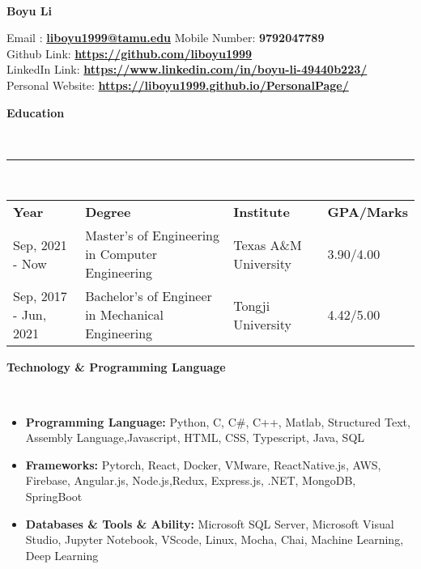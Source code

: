 \documentclass[a4paper,10pt]{article}
\newcommand{\lsep}{-0.5cm}
\newcommand{\resheading}[1]{{\small \colorbox{mygrey}{\begin{minipage}{0.975\textwidth}{\textbf{#1 \vphantom{p\^{E}}}}\end{minipage}}}}
\begin{document}
\hspace{0.5cm}\\[-0.2cm]
\begin{center}
\textbf{Boyu Li}   
\end{center}
\hspace{0.2in}Email : \textbf{\url{liboyu1999@tamu.edu}} \hfill Mobile Number: \textbf{9792047789}  \\
\indent Github Link: \textbf{\url{https://github.com/liboyu1999}}\\
\indent LinkedIn Link: \textbf{\url{https://www.linkedin.com/in/boyu-li-49440b223/}}\\
\indent Personal Website: \textbf{\url{https://liboyu1999.github.io/PersonalPage/}}
 
\resheading{\textbf{Education} }\\[\lsep]

\indent \rule{6.8in}{0.4pt}\\
\indent \begin{tabular}{ l @{\hskip 0.1in} l @{\hskip 0.1in} l @{\hskip 0.1in} l @{\hskip 0.1in} }
\noindent \textbf{Year} & \textbf{Degree} & \textbf{Institute} & \textbf{GPA/Marks}\\
Sep, 2021 - Now & Master's of Engineering in Computer Engineering & Texas A\&M University & 3.90/4.00\\
Sep, 2017 - Jun, 2021 & Bachelor's of Engineer in Mechanical Engineering & Tongji University & 4.42/5.00 \\
 
\end{tabular}

\resheading{\textbf{Technology \& Programming Language} }\\[\lsep]
\begin{itemize}
\setlength\itemsep{-0.5em}
\item \textbf{Programming Language: }Python, C, C\#, C++, Matlab, Structured Text, Assembly Language,Javascript, HTML, CSS, Typescript, Java, SQL
\item \textbf{Frameworks: }Pytorch, React, Docker, VMware, ReactNative.js, AWS, Firebase, Angular.js, Node.js,Redux, Express.js, .NET, MongoDB, SpringBoot
\item \textbf{Databases \& Tools \& Ability: }Microsoft SQL Server, Microsoft Visual Studio, Jupyter Notebook, VScode, Linux, Mocha, Chai, Machine Learning, Deep Learning
\end{itemize}
\end{document}
